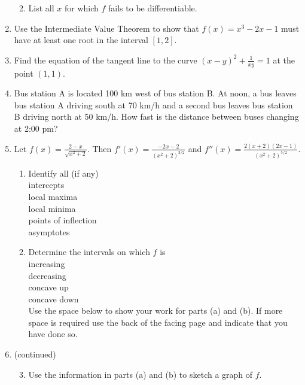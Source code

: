 \documentclass[12pt]{article}
\newcommand{\ds}{\displaystyle}
\begin{document}
\begin{enumerate}
\begin{enumerate}
\vfill
  \item List all $x$ for which $f$ fails to be differentiable.
\vfill
  \end{enumerate}
\newpage
\item Use 
  the Intermediate Value Theorem to show that $\ds f(x)=x^3-2x-1$ must have
  at least one root in the interval $[1,2]$.
\vfill
\item Find
  the equation of the tangent line to the curve $\ds (x-y)^2+\frac{1}{xy}=1$
  at the point $(1,1)$.
\vfill
\vfill
\vfill
\newpage
\item Bus 
  station A is located 100 km west of bus station B.  At noon, a bus leaves
  bus station A driving south at 70 km/h and a second bus leaves bus station
  B driving north at 50 km/h.  How fast is the distance between buses changing
  at 2:00 pm?
\newpage
\item Let
  $\ds f(x)=\frac{2-x}{\sqrt{x^2+2}}$.  Then
  $\ds f'(x) = \frac{-2x-2}{(x^2+2)^{3/2}}$ and
  $\ds f''(x) = \frac{2(x+2)(2x-1)}{(x^2+2)^{5/2}}$.
  \begin{enumerate}
  \item Identify all (if any) \\
    intercepts \hrulefill \\
    local maxima \hrulefill \\
    local minima \hrulefill \\
    points of inflection \hrulefill \\
    asymptotes \hrulefill 
  \item Determine the intervals on which $f$ is \\
    increasing \hrulefill \\
    decreasing \hrulefill \\
    concave up \hrulefill \\
    concave down \hrulefill \\
    Use the space below to show your work for parts (a) and (b).  If more space
    is required use the back of the facing page and indicate that you have
    done so.
\vfill
  \end{enumerate}
\newpage
\addtocounter{enumi}{-1}
\item (continued)
  \begin{enumerate}
  \setcounter{enumii}{2}
  \item Use the information in parts (a) and (b) to sketch a graph of $f$.
  \end{enumerate}

\end{enumerate}
\end{document}
